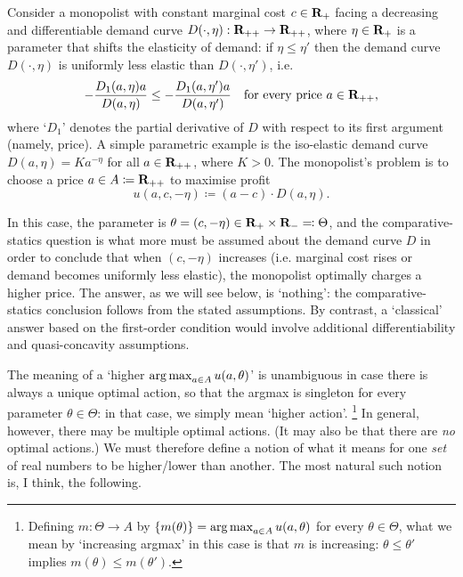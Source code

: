 \begin{example}
	\label{example:monopoly}
	Consider a monopolist with constant marginal cost $c \in \mathbf{R}_+$ facing a decreasing and differentiable demand curve $D(\cdot,\eta) : \mathbf{R}_{++} \to \mathbf{R}_{++}$, where $\eta \in \mathbf{R}_+$ is a parameter that shifts the elasticity of demand: if $\eta \leq \eta'$ then the demand curve $D(\cdot,\eta)$ is uniformly less elastic than $D(\cdot,\eta')$, i.e.
	\begin{equation*}
		- \frac{ D_1(a,\eta) a }{ D(a,\eta) }
		\leq
		- \frac{ D_1(a,\eta') a }{ D(a,\eta') }
		\quad \text{for every price $a \in \mathbf{R}_{++}$,}
	\end{equation*}
	where `$D_1$' denotes the partial derivative of $D$ with respect to its first argument (namely, price). A simple parametric example is the iso-elastic demand curve $D(a,\eta) = K a^{-\eta}$ for all $a \in \mathbf{R}_{++}$, where $K>0$.
	The monopolist's problem is to choose a price $a \in A \coloneqq \mathbf{R}_{++}$ to maximise profit
	\begin{equation*}
		u(a,c,-\eta) \coloneqq (a-c) \cdot D(a,\eta) .
	\end{equation*}
	
	In this case, the parameter is $\theta = (c,-\eta) \in \mathbf{R}_+ \times \mathbf{R}_- \eqqcolon \Theta$, and the comparative-statics question is what more must be assumed about the demand curve $D$ in order to conclude that when $(c,-\eta)$ increases (i.e. marginal cost rises or demand becomes uniformly less elastic), the monopolist optimally charges a higher price.
	The answer, as we will see below, is `nothing': the comparative-statics conclusion follows from the stated assumptions. By contrast, a `classical' answer based on the first-order condition would involve additional differentiability and quasi-concavity assumptions.
\end{example}

The meaning of a `higher $\operatorname*{arg\,max}_{a \in A} u(a,\theta)$' is unambiguous in case there is always a unique optimal action, so that the argmax is singleton for every parameter $\theta \in \Theta$: in that case, we simply mean `higher action'.%
	\footnote{Defining $m : \Theta \to A$ by $\{ m(\theta) \} = \operatorname*{arg\,max}_{a \in A} u(a,\theta)$ for every $\theta \in \Theta$, what we mean by `increasing argmax' in this case is that $m$ is increasing: $\theta \leq \theta'$ implies $m(\theta) \leq m(\theta')$.}
In general, however, there may be multiple optimal actions. (It may also be that there are \emph{no} optimal actions.) We must therefore define a notion of what it means for one \emph{set} of real numbers to be higher/lower than another. The most natural such notion is, I think, the following.


